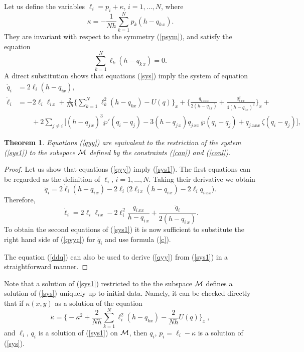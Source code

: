\documentclass[a4paper,11pt]{article}
\theoremstyle{plain}
\newtheorem{teo}{Theorem}
\theoremstyle{remark}
\begin{document}
Let us define the variables $\ell_i=p_i+\kappa$, $i=1,\dots,N$, where
\begin{equation}\label{kap}
\kappa=-\frac{1}{Nh}\sum_{k=1}^N p_k(h-q_{k\,x}).
\end{equation}
They are invariant with respect to the symmetry (\ref{psym}), and satisfy
the equation
\begin{equation}\label{conl}
\sum_{k=1}^N \ell_k(h-q_{k\,x})=0.
\end{equation}
A direct substitution shows that equations (\ref{sys}) imply the system
of equation
\begin{equation}\label{sys1}
\begin{aligned}
\dot q_i&=2\ell_i (h-q_{ix}) ,\\
\dot \ell_i&=-2\ell_i\ell_{i\,x}+\frac{2}{Nh} \biggl\{ \sum_{k=1}^N
 \ell_k^2(h-q_{kx}) - U(q) \biggr\}_{\!x} + \biggl\{
 \frac{q_{i\,xxx}}{2(h-q_{i\,x})}+\frac{q_{i\,xx}^2}{4(h-q_{i\,x})^2}
\biggr\}_{\!x} + {}\\
{}&\qquad{}+2 \sum_{j\ne i} \bigl[ (h-q_{j\,x})^3 \wp'(q_i-q_j)
 -3(h-q_{j\,x})q_{j\,xx}\,\wp(q_i-q_j)+q_{j\,xxx}\,\zeta(q_i-q_j) \bigr] ,
\end{aligned}
\end{equation}
\begin{teo}
Equations \emph{(\ref{qyy})} are equivalent to the restriction of
the system \emph{(\ref{sys1})} to the subspace $\cal M$ defined
by the constraints \emph{(\ref{con})} and \emph{(\ref{conl})}.
\end{teo}
\begin{proof}
Let us show that equations (\ref{qyy}) imply (\ref{sys1}).
The first equations can be regarded as the definition of $\ell_i$,
$i=1,\dots,N$. Taking their derivative we obtain
\begin{equation}\label{ddq}
\ddot q_i=2\dot\ell_i(h-q_{i\,x})-2\ell_i
\bigl( 2\ell_{i\,x}(h-q_{i\,x})-2\ell_i q_{i\,xx}\bigr) .
\end{equation}
Therefore,
$$
\dot\ell_i=2\ell_i\ell_{i\,x}-2\ell_i^2 \frac{q_{i\,xx}}{h-q_{i\,x}}
+\frac{\ddot q_i}{2(h-q_{i\,x})} .
$$
To obtain the second equations of (\ref{sys1}) it is now sufficient
to substitute the right hand side of (\ref{qyyc}) for $\ddot q_i$
and use formula (\ref{c}).

The equation (\ref{ddq}) can also be used to derive (\ref{qyy})
from (\ref{sys1}) in a straightforward manner.
\end{proof}

Note that a solution of (\ref{sys1}) restricted to the the subspace $\cal M$
defines a solution of (\ref{sys}) uniquely up to initial data. Namely,
it can be checked directly that if $\kappa(x,y)$ as a solution of the equation
\begin{equation}\label{kap}
\dot \kappa= \biggl\{-\kappa^2 +
\frac{2}{Nh}\sum_{k=1}^N \ell_i^2(h-q_{kx})-\frac{2}{Nh} U(q)
\biggr\}_{\!x}\ ,
\end{equation}
and $\ell_i$, $q_i$ is a solution of (\ref{sys1}) on $\cal M$, then
$q_i$, $p_i=\ell_i-\kappa$ is a solution of (\ref{sys}).
\end{document}
